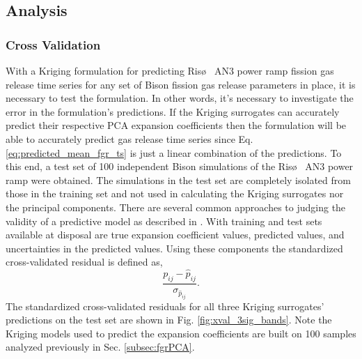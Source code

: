\subsection{Analysis}
\label{subsec:test_on_point_kinetics}


\subsubsection{Cross Validation}
\label{subsec:cross_validation}

With a Kriging formulation for predicting Ris\o~ AN3 power ramp fission gas release time series for any set of Bison fission gas release parameters in place, it is necessary to test the formulation. In other words, it's necessary to investigate the error in the formulation's predictions. If the Kriging surrogates can accurately predict their respective \ac{PCA} expansion coefficients then the formulation will be able to accurately predict gas release time series since Eq. \ref{eq:predicted_mean_fgr_ts} is just a linear combination of the predictions. To this end, a test set of 100 independent Bison simulations of the Ris\o~ AN3 power ramp were obtained. The simulations in the test set are completely isolated from those in the training set and not used in calculating the Kriging surrogates nor the principal components. There are several common approaches to judging the validity of a predictive model as described in \cite{Jones_Schonlau}. With training and test sets available at disposal are true expansion coefficient values, predicted values, and uncertainties in the predicted values. Using these components the standardized cross-validated residual is defined as,
\begin{equation}
\label{eq:stnd_xval_residual}
 \frac{ p_{ij} - \hat{p}_{ij} }{ \sigma_{\hat{p}_{ij}} } . 
\end{equation}  
The standardized cross-validated residuals for all three Kriging surrogates' predictions on the test set are shown in Fig. \ref{fig:xval_3sig_bands}. Note the Kriging models used to predict the expansion coefficients are built on 100 samples analyzed previously in Sec. \ref{subsec:fgrPCA}.  
